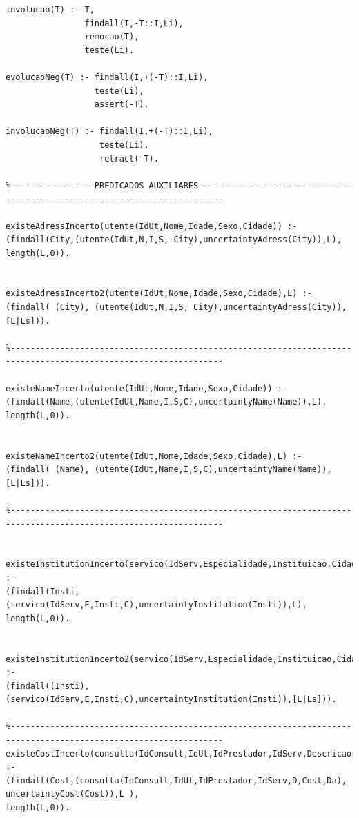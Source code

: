 \documentclass[25pt]{article}
\begin{document}
\begin{lstlisting}
involucao(T) :- T,
                findall(I,-T::I,Li),
                remocao(T),
                teste(Li).

evolucaoNeg(T) :- findall(I,+(-T)::I,Li),
                  teste(Li),
                  assert(-T).

involucaoNeg(T) :- findall(I,+(-T)::I,Li),
                   teste(Li),
                   retract(-T).     

%-----------------PREDICADOS AUXILIARES---------------------------------------------------------------------------

existeAdressIncerto(utente(IdUt,Nome,Idade,Sexo,Cidade)) :- 
(findall(City,(utente(IdUt,N,I,S, City),uncertaintyAdress(City)),L),
length(L,0)).
                                                              

existeAdressIncerto2(utente(IdUt,Nome,Idade,Sexo,Cidade),L) :- 
(findall( (City), (utente(IdUt,N,I,S, City),uncertaintyAdress(City)),[L|Ls])).

%-----------------------------------------------------------------------------------------------------------------

existeNameIncerto(utente(IdUt,Nome,Idade,Sexo,Cidade)) :- 
(findall(Name,(utente(IdUt,Name,I,S,C),uncertaintyName(Name)),L),
length(L,0)).
                                                              

existeNameIncerto2(utente(IdUt,Nome,Idade,Sexo,Cidade),L) :- 
(findall( (Name), (utente(IdUt,Name,I,S,C),uncertaintyName(Name)),[L|Ls])).

%-----------------------------------------------------------------------------------------------------------------


existeInstitutionIncerto(servico(IdServ,Especialidade,Instituicao,Cidade)) :- 
(findall(Insti,(servico(IdServ,E,Insti,C),uncertaintyInstitution(Insti)),L),
length(L,0)).
                                                               

existeInstitutionIncerto2(servico(IdServ,Especialidade,Instituicao,Cidade),L) :- 
(findall((Insti),(servico(IdServ,E,Insti,C),uncertaintyInstitution(Insti)),[L|Ls])).

%-----------------------------------------------------------------------------------------------------------------
existeCostIncerto(consulta(IdConsult,IdUt,IdPrestador,IdServ,Descricao,Custo,Data)) :- 
(findall(Cost,(consulta(IdConsult,IdUt,IdPrestador,IdServ,D,Cost,Da), uncertaintyCost(Cost)),L ),
length(L,0)).


\end{lstlisting}
\end{document}
